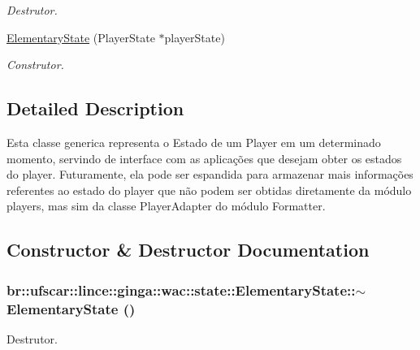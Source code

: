 \begin{DoxyCompactItemize}
\begin{DoxyCompactList}\small\item\em Destrutor. \item\end{DoxyCompactList}\item 
\hyperlink{classbr_1_1ufscar_1_1lince_1_1ginga_1_1wac_1_1state_1_1ElementaryState_ad47a64749c66f7257d36911ade24ea77}{ElementaryState} (PlayerState $\ast$playerState)
\begin{DoxyCompactList}\small\item\em Construtor. \item\end{DoxyCompactList}\end{DoxyCompactItemize}


\subsection{Detailed Description}
Esta classe generica representa o Estado de um Player em um determinado momento, servindo de interface com as aplicações que desejam obter os estados do player. Futuramente, ela pode ser espandida para armazenar mais informações referentes ao estado do player que não podem ser obtidas diretamente da módulo players, mas sim da classe PlayerAdapter do módulo Formatter. 

\subsection{Constructor \& Destructor Documentation}
\hypertarget{classbr_1_1ufscar_1_1lince_1_1ginga_1_1wac_1_1state_1_1ElementaryState_abd089616d40c13eb528a92984252a58f}{
\subsubsection[{$\sim$ElementaryState}]{\setlength{\rightskip}{0pt plus 5cm}br::ufscar::lince::ginga::wac::state::ElementaryState::$\sim$ElementaryState ()}}
\label{classbr_1_1ufscar_1_1lince_1_1ginga_1_1wac_1_1state_1_1ElementaryState_abd089616d40c13eb528a92984252a58f}


Destrutor. 


